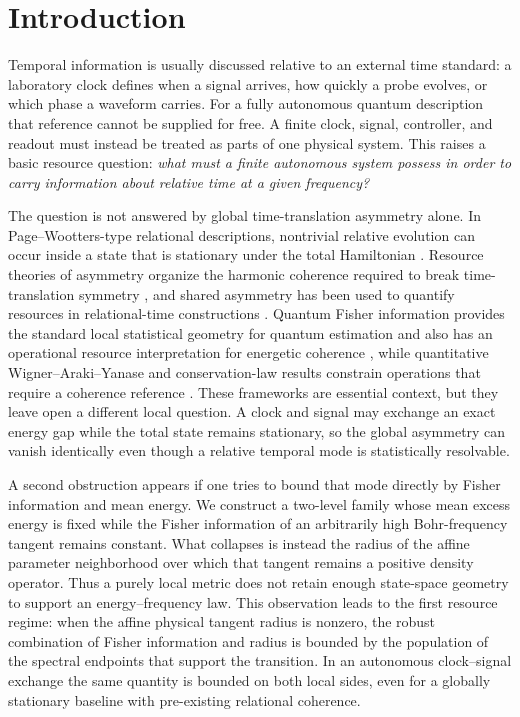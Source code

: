 \section{Introduction}
\label{sec:introduction}

Temporal information is usually discussed relative to an external time standard: a laboratory clock defines when a signal arrives, how quickly a probe evolves, or which phase a waveform carries. For a fully autonomous quantum description that reference cannot be supplied for free. A finite clock, signal, controller, and readout must instead be treated as parts of one physical system. This raises a basic resource question: \emph{what must a finite autonomous system possess in order to carry information about relative time at a given frequency?}

The question is not answered by global time-translation asymmetry alone. In Page--Wootters-type relational descriptions, nontrivial relative evolution can occur inside a state that is stationary under the total Hamiltonian \cite{PageWootters1983}. Resource theories of asymmetry organize the harmonic coherence required to break time-translation symmetry \cite{MarvianSpekkens2014Modes}, and shared asymmetry has been used to quantify resources in relational-time constructions \cite{CarmoSoaresPinto2021}. Quantum Fisher information provides the standard local statistical geometry for quantum estimation \cite{BraunsteinCaves1994} and also has an operational resource interpretation for energetic coherence \cite{Marvian2022,YamaguchiTajima2023}, while quantitative Wigner--Araki--Yanase and conservation-law results constrain operations that require a coherence reference \cite{MarvianSpekkensWAY2012,TajimaShiraishiSaito2020}. These frameworks are essential context, but they leave open a different local question. A clock and signal may exchange an exact energy gap while the total state remains stationary, so the global asymmetry can vanish identically even though a relative temporal mode is statistically resolvable.

A second obstruction appears if one tries to bound that mode directly by Fisher information and mean energy. We construct a two-level family whose mean excess energy is fixed while the Fisher information of an arbitrarily high Bohr-frequency tangent remains constant. What collapses is instead the radius of the affine parameter neighborhood over which that tangent remains a positive density operator. Thus a purely local metric does not retain enough state-space geometry to support an energy--frequency law. This observation leads to the first resource regime: when the affine physical tangent radius is nonzero, the robust combination of Fisher information and radius is bounded by the population of the spectral endpoints that support the transition. In an autonomous clock--signal exchange the same quantity is bounded on both local sides, even for a globally stationary baseline with pre-existing relational coherence.

